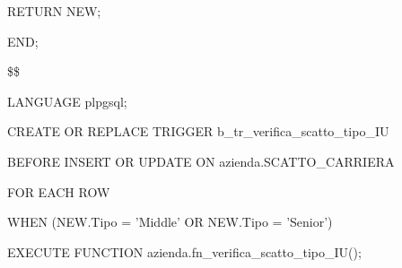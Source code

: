 \begin{flushleft}
\begin{description}
\begin{description}
                        \item RETURN NEW;
                    \end{description}
                    \item END;
                    \item \$\$
                    \item LANGUAGE plpgsql;
                \end{description}
            \end{flushleft}
        \normalfont

        \ttfamily
            \begin{flushleft}
                \begin{description}
                    \item CREATE OR REPLACE TRIGGER b\_tr\_verifica\_scatto\_tipo\_IU
                    \item BEFORE INSERT OR UPDATE ON azienda.SCATTO\_CARRIERA
                    \item FOR EACH ROW
                    \item WHEN (NEW.Tipo = 'Middle' OR NEW.Tipo = 'Senior')
                    \item EXECUTE FUNCTION azienda.fn\_verifica\_scatto\_tipo\_IU();
                \end{description}
            \end{flushleft}
        \normalfont


